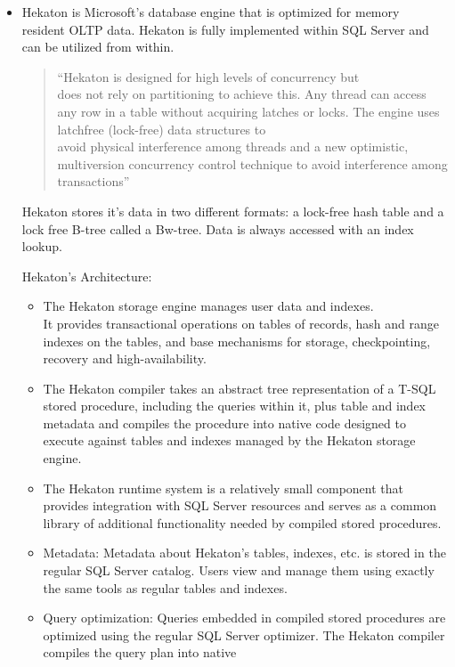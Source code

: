 \documentclass[letterpaper, 11pt]{article}
\begin{document}
\begin{itemize}
  \item Hekaton is Microsoft's database engine that is optimized for memory \\ resident
  OLTP data. Hekaton is fully implemented within SQL Server and can be utilized from
  within.
  \begin{quote}
  ``Hekaton is designed for high levels of concurrency but \\ does not
  rely on partitioning to achieve this. Any thread can access any row
  in a table without acquiring latches or locks. The engine uses latchfree
  (lock-free) data structures to \\ avoid physical interference
  among threads and a new optimistic, multiversion concurrency
  control technique to avoid interference among transactions''\cite{hekaton}
  \end{quote}
  Hekaton stores it's data in two different formats: a lock-free hash table and a
  lock free B-tree called a Bw-tree. Data is always accessed with an index lookup.
  \par\vspace{\baselineskip}
  Hekaton's Architecture:
\begin{itemize}
  \item The Hekaton storage engine manages user data and indexes.\\
  It provides transactional operations on tables of records, hash
  and range indexes on the tables, and base mechanisms for storage,
  checkpointing, recovery and high-availability.
  \item The Hekaton compiler takes an abstract tree representation of
  a T-SQL stored procedure, including the queries within it, plus
  table and index metadata and compiles the procedure into native
  code designed to execute against tables and indexes managed
  by the Hekaton storage engine.
  \item The Hekaton runtime system is a relatively small component
  that provides integration with SQL Server resources and
  serves as a common library of additional functionality needed
  by compiled stored procedures.
  \item Metadata: Metadata about Hekaton's tables, indexes, etc. is
  stored in the regular SQL Server catalog. Users view and manage
  them using exactly the same tools as regular tables and indexes.
  \item Query optimization: Queries embedded in compiled stored
  procedures are optimized using the regular SQL Server optimizer.
  The Hekaton compiler compiles the query plan into native

\end{itemize}
\end{itemize}
\end{document}

